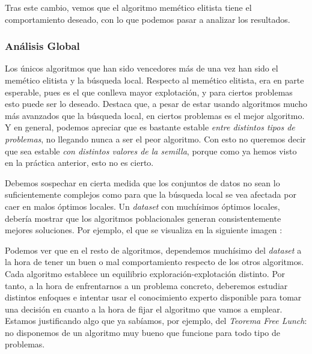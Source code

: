 \documentclass[11pt]{article}
\begin{document}
Tras este cambio, vemos que el algoritmo memético elitista tiene el comportamiento deseado, con lo que podemos pasar a analizar los resultados.

\subsubsection{Análisis Global}

Los únicos algoritmos que han sido vencedores más de una vez han sido el memético elitista y la búsqueda local. Respecto al memético elitista, era en parte esperable, pues es el que conlleva mayor explotación, y para ciertos problemas esto puede ser lo deseado. Destaca que, a pesar de estar usando algoritmos mucho más avanzados que la búsqueda local, en ciertos problemas es el mejor algoritmo. Y en general, podemos apreciar que es bastante estable \emph{entre distintos tipos de problemas}, no llegando nunca a ser el peor algoritmo. Con esto no queremos decir que sea estable \emph{con distintos valores de la semilla}, porque como ya hemos visto en la práctica anterior, esto no es cierto.

Debemos sospechar en cierta medida que los conjuntos de datos no sean lo suficientemente complejos como para que la búsqueda local se vea afectada por caer en malos óptimos locales. Un \emph{dataset} con muchísimos óptimos locales, debería mostrar que los algoritmos poblacionales generan consistentemente mejores soluciones. Por ejemplo, el que se visualiza en la siguiente imagen \footnotemark:



Podemos ver que en el resto de algoritmos, dependemos muchísimo del \emph{dataset} a la hora de tener un buen o mal comportamiento respecto de los otros algoritmos. Cada algoritmo establece un equilibrio exploración-explotación distinto. Por tanto, a la hora de enfrentarnos a un problema concreto, deberemos estudiar distintos enfoques e intentar usar el conocimiento experto disponible para tomar una decisión en cuanto a la hora de fijar el algoritmo que vamos a emplear. Estamos justificando algo que ya sabíamos, por ejemplo, del \emph{Teorema Free Lunch}: no disponemos de un algoritmo muy bueno que funcione para todo tipo de problemas.
\end{document}
